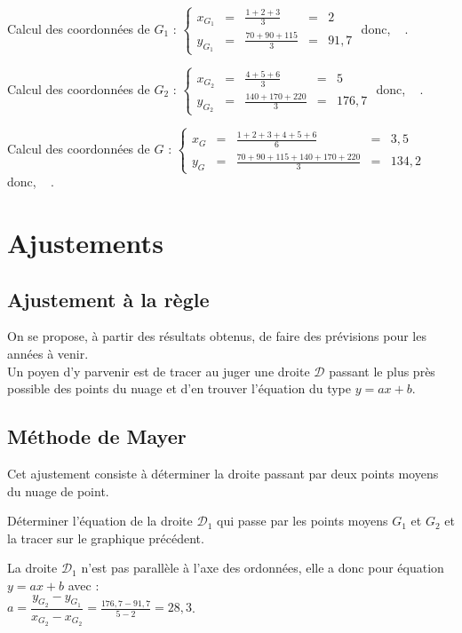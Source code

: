 \documentclass[french]{book}
\newcommand{\Syst}[2]{\left\{\begin{array}{lcccc} #1 \\ #2 \end{array}\right.}
\begin{document}
Calcul des coordonnées de $G_1$ : $\Syst{x_{G_1} & = & \frac{1+2+3}{3} & = & 2}{y_{G_1} & = & \frac{70+90+115}{3} & = & 91,7}$ \qquad donc, ~ .

Calcul des coordonnées de $G_2$ : $\Syst{x_{G_2} & = & \frac{4+5+6}{3} & = & 5}{y_{G_2} & = & \frac{140+170+220}{3} & = & 176,7}$ \qquad donc, ~ .

Calcul des coordonnées de $G$ : $\Syst{x_G & = & \frac{1+2+3+4+5+6}{6} & = & 3,5}{y_G & = & \frac{70+90+115+140+170+220}{3} & = & 134,2}$ \qquad donc, ~ .


\section{Ajustements}


\subsection{Ajustement à la règle}

On se propose, à partir des résultats obtenus, de faire des prévisions pour les années à venir. \\
Un poyen d'y parvenir est de tracer au juger une droite $\mathcal{D}$ passant le plus près possible des points du nuage et d'en trouver l'équation du type $y=ax+b$.


\subsection{Méthode de Mayer}

Cet ajustement consiste à déterminer la droite passant par deux points moyens du nuage de point.


\begin{exemple}
   Déterminer l'équation de la droite $\mathcal{D}_1$ qui passe par les points moyens $G_1$ et $G_2$ et la tracer sur le graphique précédent.
\end{exemple}

La droite $\mathcal{D}_1$ n'est pas parallèle à l'axe des ordonnées, elle a donc pour équation $y=ax+b$ avec : \\
$a=\dfrac{y_{G_2}-y_{G_1}}{x_{G_2}-x_{G_2}}=\frac{176,7-91,7}{5-2}=28,3$.
\end{document}
